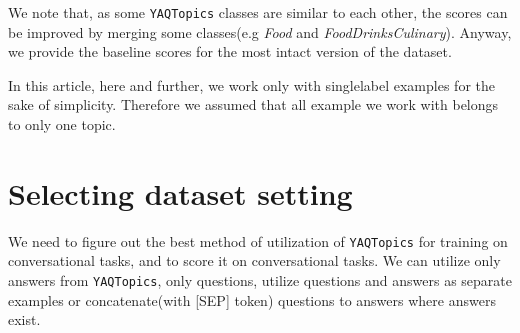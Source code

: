 \begin{table*}
\centering
\caption{Accuracy(f1) of the Russian baseline models for different versions of \texttt{YAQTopics}. \textbf{Q} means questions, \textbf{A} means answers, \textbf{Q and A} means treating questions and answers as separate examples, and \textbf{Q [SEP] A} means concatenation  of every questions with the corresponding answer(if that answer exist) using [SEP] token. Full means we have used singlelabel and multilabel data. Otherwise we have used only singlelabel data/  Backbone: \textit{sbert\_large\_nlu\_ru}.}
\end{table*}


We note that, as some \texttt{YAQTopics} classes are similar to each other, the scores can be improved by merging some classes(e.g \textit{Food} and \textit{FoodDrinksCulinary}). Anyway, we provide the baseline scores for the most intact version of the dataset. 


 In this article, here and further, we work only with singlelabel examples for the sake of simplicity. Therefore we assumed that all example we work with belongs to only one topic. 


\section{Selecting dataset setting} 

We need to figure out the best method of utilization of \texttt{YAQTopics} for training on conversational tasks, and to score it on conversational tasks. We can utilize only answers from \texttt{YAQTopics}, only questions, utilize questions and answers as separate examples or concatenate(with [SEP] token) questions to answers where answers exist. 


